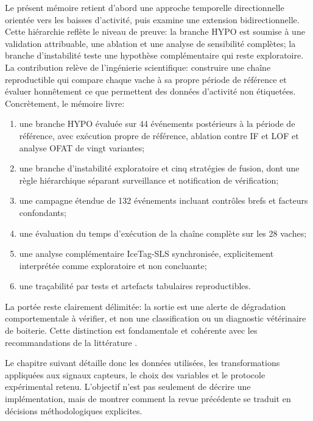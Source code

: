 Le présent mémoire retient d'abord une approche temporelle directionnelle orientée vers les
baisses d'activité, puis examine une extension bidirectionnelle. Cette hiérarchie reflète le
niveau de preuve: la branche HYPO est soumise à une validation attribuable, une ablation et
une analyse de sensibilité complètes; la branche d'instabilité teste une hypothèse
complémentaire qui reste exploratoire. La contribution relève de l'ingénierie scientifique:
construire une chaîne reproductible qui compare chaque vache à sa propre période de référence et évaluer
honnêtement ce que permettent des données d'activité non étiquetées. Concrètement, le
mémoire livre:
\begin{enumerate}
  \item une branche HYPO évaluée sur 44 événements postérieurs à la période de référence, avec exécution propre de
  référence, ablation contre IF et LOF et analyse OFAT de vingt variantes;
  \item une branche d'instabilité exploratoire et cinq stratégies de fusion, dont une règle
  hiérarchique séparant surveillance et notification de vérification;
  \item une campagne étendue de 132 événements incluant contrôles brefs et facteurs
  confondants;
  \item une évaluation du temps d'exécution de la chaîne complète sur les 28 vaches;
  \item une analyse complémentaire IceTag-SLS synchronisée, explicitement interprétée comme
  exploratoire et non concluante;
  \item une traçabilité par tests et artefacts tabulaires reproductibles.
\end{enumerate}

La portée reste clairement délimitée: la sortie est une alerte de dégradation
comportementale à vérifier, et non une classification ou un diagnostic vétérinaire de
boiterie. Cette distinction est fondamentale et cohérente avec les recommandations de la
littérature \citep{alsaaod2019automatic}.

Le chapitre suivant détaille donc les données utilisées, les transformations appliquées aux
signaux capteurs, le choix des variables et le protocole expérimental retenu. L'objectif n'est
pas seulement de décrire une implémentation, mais de montrer comment la revue précédente se
traduit en décisions méthodologiques explicites.

